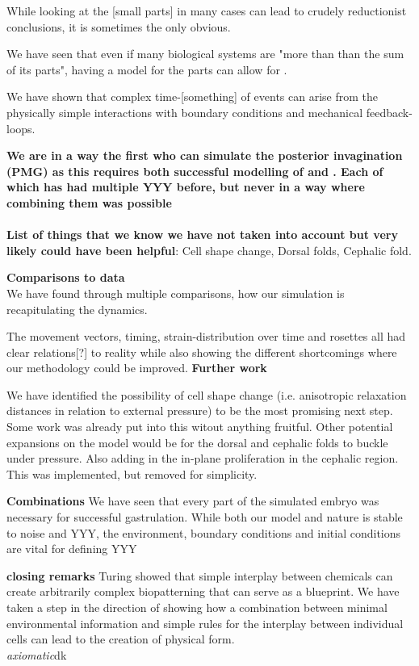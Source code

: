 While looking at the [small parts] in many cases can lead to crudely reductionist conclusions, it is sometimes the only obvious.

We have seen that even if many biological systems are "more than than the sum of its parts", having a model for the parts can allow for .

We have shown that complex time-[something] of events can arise from the physically simple interactions with boundary conditions and mechanical feedback-loops.

\textbf{We are in a way the first who can simulate the posterior invagination (PMG)  as this requires both successful modelling of  and . Each of which has had multiple YYY before, but never in a way where combining them was possible}\\\\


\textbf{List of things that we know we have not taken into account but very likely could have been helpful}:
Cell shape change, Dorsal folds, Cephalic fold.

\textbf{Comparisons to data}\\
We have found through multiple comparisons, how our simulation is recapitulating the dynamics.

The movement vectors, timing, strain-distribution over time and rosettes all had clear relations[?] to reality while also showing the different shortcomings where our methodology could be improved.
\textbf{Further work}

We have identified the possibility of cell shape change (i.e. anisotropic relaxation distances in relation to external pressure) to be the most promising next step. Some work was already put into this witout anything fruitful. Other potential expansions on the model would be for the dorsal and cephalic folds to buckle under pressure. Also adding in the in-plane proliferation in the cephalic region. This was implemented, but removed for simplicity.

\textbf{Combinations}
We have seen that every part of the simulated embryo was necessary for successful gastrulation. 
While both our model and nature is stable to noise and YYY, the environment, boundary conditions and initial conditions are vital for defining YYY

\textbf{closing remarks}
Turing showed that simple interplay between chemicals can create arbitrarily complex biopatterning that can serve as a blueprint. We have taken a step in the direction of showing how a combination between minimal environmental information and simple rules for the interplay between individual cells can lead to the creation of physical form. \\


\textit{axiomatic}dk